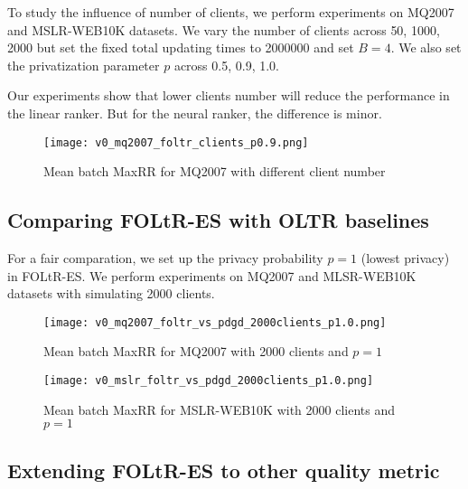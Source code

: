 To study the influence of number of clients, we perform experiments on MQ2007 and MSLR-WEB10K datasets. We vary the number of clients across {50, 1000, 2000} but set the fixed total updating times to 2000000 and set $B = 4$. We also set the privatization parameter $p$ across {0.5, 0.9, 1.0}.

Our experiments show that lower clients number will reduce the performance in the linear ranker. But for the neural ranker, the difference is minor.

\begin{figure}[H]
	\centering
	\texttt{[image: v0\_mq2007\_foltr\_clients\_p0.9.png]}
	\caption{Mean batch MaxRR for MQ2007 with different client number}
	\label{fig: mq2007clients}
\end{figure}


\subsection{Comparing FOLtR-ES with OLTR baselines}

For a fair comparation, we set up the privacy probability $p = 1$ (lowest privacy) in FOLtR-ES. We perform experiments on MQ2007 and MLSR-WEB10K datasets with simulating 2000 clients.

\begin{figure}[H]
	\centering
	\texttt{[image: v0\_mq2007\_foltr\_vs\_pdgd\_2000clients\_p1.0.png]}
	\caption{Mean batch MaxRR for MQ2007 with 2000 clients and $p = 1$}
	\label{fig: mq2007-v0-baseline}
\end{figure}

\begin{figure}[H]
	\centering
	\texttt{[image: v0\_mslr\_foltr\_vs\_pdgd\_2000clients\_p1.0.png]}
	\caption{Mean batch MaxRR for MSLR-WEB10K with 2000 clients and $p = 1$}
	\label{fig: mslr-v0-baseline}
\end{figure}

\subsection{Extending FOLtR-ES to other quality metric}



